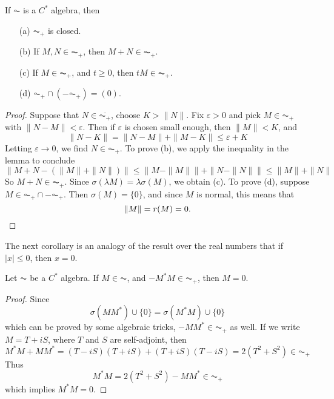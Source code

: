 \begin{prop}
    If $\AC$ is a $C^*$ algebra, then
    \begin{enumerate}
        \item[(a)] $\AC_+$ is closed.
        \item[(b)] If $M,N \in \AC_+$, then $M + N \in \AC_+$.
        \item[(c)] If $M \in \AC_+$, and $t \geq 0$, then $tM \in \AC_+$.
        \item[(d)] $\AC_+ \cap (-\AC_+) = (0)$.
    \end{enumerate}
\end{prop}
\begin{proof}
    Suppose that $N \in \overline{\AC_+}$, choose $K > \| N \|$. Fix $\varepsilon > 0$ and pick $M \in \AC_+$ with $\| N - M \| < \varepsilon$. Then if $\varepsilon$ is chosen small enough, then $\| M \| < K$, and
    \[ \| N - K \| = \| N - M \| + \| M - K \| \leq \varepsilon + K \]
    Letting $\varepsilon \to 0$, we find $N \in \AC_+$. To prove (b), we apply the inequality in the lemma to conclude
    \[ \| M + N - (\| M \| + \| N \| ) \| \leq \| M - \| M \| \| + \| N - \| N \| \| \leq \| M \| + \| N \| \]
    So $M + N \in \AC_+$. Since $\sigma(\lambda M) = \lambda \sigma(M)$, we obtain (c). To prove (d), suppose $M \in \AC_+ \cap -\AC_+$. Then $\sigma(M) = \{ 0 \}$, and since $M$ is normal, this means that
    \[ \| M \| = r(M) = 0. \qedhere \]
\end{proof}

The next corollary is an analogy of the result over the real numbers that if $|x| \leq 0$, then $x = 0$.

\begin{lemma}
    Let $\AC$ be a $C^*$ algebra. If $M \in \AC$, and $-M^*M \in \AC_+$, then $M = 0$.
\end{lemma}
\begin{proof}
    Since
    \[ \sigma(MM^*) \cup \{ 0 \} = \sigma(M^*M) \cup \{ 0 \} \]
    which can be proved by some algebraic tricks, $-MM^* \in \AC_+$ as well. If we write $M = T + iS$, where $T$ and $S$ are self-adjoint, then
    \[ M^*M + MM^* = (T - iS)(T + iS) + (T + iS)(T - iS) = 2(T^2 + S^2) \in \AC_+ \]
    Thus
    \[ M^*M = 2(T^2 + S^2) - MM^* \in \AC_+ \]
    which implies $M^*M = 0$.
\end{proof}

